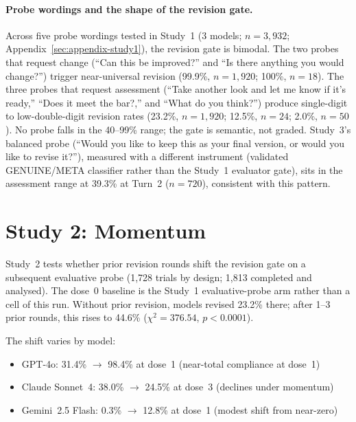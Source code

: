 \paragraph{Probe wordings and the shape of the revision gate.}
Across five probe wordings tested in Study~1 (3 models; $n = 3{,}932$; Appendix~\ref{sec:appendix-study1}), the revision gate is bimodal. The two probes that request change (``Can this be improved?'' and ``Is there anything you would change?'') trigger near-universal revision (99.9\%, $n = 1{,}920$; 100\%, $n = 18$). The three probes that request assessment (``Take another look and let me know if it's ready,'' ``Does it meet the bar?,'' and ``What do you think?'') produce single-digit to low-double-digit revision rates (23.2\%, $n = 1{,}920$; 12.5\%, $n = 24$; 2.0\%, $n = 50$). No probe falls in the 40--99\% range; the gate is semantic, not graded. Study~3's balanced probe (``Would you like to keep this as your final version, or would you like to revise it?''), measured with a different instrument (validated GENUINE/META classifier rather than the Study~1 evaluator gate), sits in the assessment range at 39.3\% at Turn~2 ($n = 720$), consistent with this pattern.


\section{Study 2: Momentum}
\label{sec:appendix-study2}

Study~2 tests whether prior revision rounds shift the revision gate on a subsequent evaluative probe (1,728 trials by design; 1,813 completed and analysed). The dose~0 baseline is the Study~1 evaluative-probe arm rather than a cell of this run. Without prior revision, models revised 23.2\% there; after 1--3 prior rounds, this rises to 44.6\% ($\chi^2 = 376.54$, $p < 0.0001$).

The shift varies by model:
\begin{itemize}
    \item GPT-4o: 31.4\% $\to$ 98.4\% at dose~1 (near-total compliance at dose~1)
    \item Claude Sonnet~4: 38.0\% $\to$ 24.5\% at dose~3 (declines under momentum)
    \item Gemini~2.5 Flash: 0.3\% $\to$ 12.8\% at dose~1 (modest shift from near-zero)
\end{itemize}

